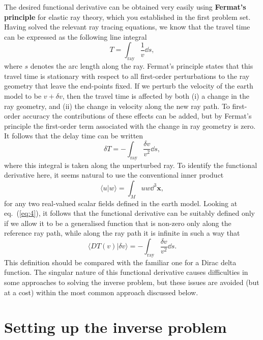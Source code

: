 The desired functional derivative can be obtained very easily using \textbf{Fermat's principle} for elastic ray theory, which you 
established in the first problem set. Having solved the relevant ray tracing equations, we know that the travel time can 
be expressed as the following line integral
\begin{equation}
    T = \int_{\mathrm{ray}} \frac{1}{v} \dd s,
    \label{eq:3}
\end{equation}
where $s$ denotes the arc length along the ray. Fermat's principle states that this travel time is stationary with respect 
to all first-order perturbations to the ray geometry that leave the end-points fixed. If we perturb the velocity of the 
earth model to be $v+\delta v$, then the travel time is affected by both (i) a change in the ray geometry, and (ii) the 
change in velocity along the new ray path. To first-order accuracy the contributions of these effects can be added, but 
by Fermat's principle the first-order term associated with the change in ray geometry is zero. It follows that the delay 
time can be written
\begin{equation}
    \delta T = -\int_{\mathrm{ray}} \frac{\delta v}{v^{2}} \dd s,
    \label{eq:4}
\end{equation}
where this integral is taken along the unperturbed ray. To identify the functional derivative here, it seems natural to use 
the conventional inner product
\begin{equation}
    \langle u|w \rangle = \int_{M} uw \dd^{3}\mathbf{x},
    \label{eq:5}
\end{equation}
for any two real-valued scalar fields defined in the earth model. Looking at eq.~(\ref{eq:4}), it follows that the functional derivative 
can be suitably defined only if we allow it to be a generalised function that is non-zero only along the reference ray path, 
while along the ray path it is infinite in such a way that
\begin{equation}
    \langle DT(v)|\delta v \rangle = -\int_{\mathrm{ray}} \frac{\delta v}{v^{2}} \dd s.
    \label{eq:6}
\end{equation}
This definition should be compared with the familiar one for a Dirac delta function. The singular nature of this functional 
derivative causes difficulties in some approaches to solving the inverse problem, but these issues are avoided (but at a cost) 
within the most common approach discussed below.

\section*{Setting up the inverse problem}

